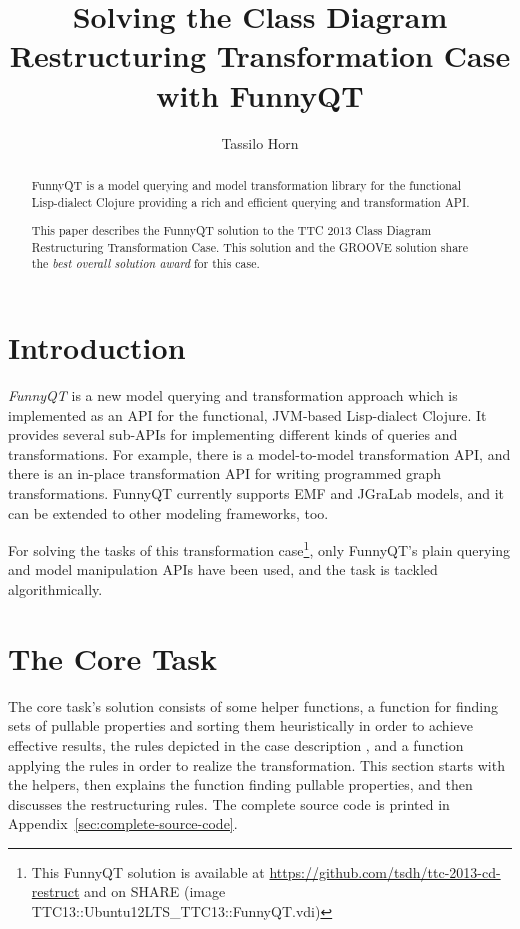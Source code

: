 \documentclass[submission]{eptcs}
\title{Solving the Class Diagram Restructuring Transformation Case with FunnyQT}
\author{Tassilo Horn
  \email{horn@uni-koblenz.de}
  \institute{Institute for Software Technology, University Koblenz-Landau, Germany}}
\begin{document}
\maketitle
\begin{abstract}
  FunnyQT is a model querying and model transformation library for the
  functional Lisp-dialect Clojure providing a rich and efficient querying and
  transformation API.

  This paper describes the FunnyQT solution to the TTC 2013 Class Diagram
  Restructuring Transformation Case.  This solution and the GROOVE solution
  share the \emph{best overall solution award} for this case.
\end{abstract}

\section{Introduction}
\label{sec:introduction}

\emph{FunnyQT} is a new model querying and transformation approach which is
implemented as an API for the functional, JVM-based Lisp-dialect Clojure.  It
provides several sub-APIs for implementing different kinds of queries and
transformations.  For example, there is a model-to-model transformation API,
and there is an in-place transformation API for writing programmed graph
transformations.  FunnyQT currently supports EMF and JGraLab models, and it can
be extended to other modeling frameworks, too.

For solving the tasks of this transformation case\footnote{This FunnyQT
  solution is available at \url{https://github.com/tsdh/ttc-2013-cd-restruct}
  and on SHARE (image
  \textsf{TTC13::Ubuntu12LTS\_TTC13::FunnyQT.vdi})\label{fn:github}}, only
FunnyQT's plain querying and model manipulation APIs have been used, and the
task is tackled algorithmically.


\section{The Core Task}
\label{sec:core-task}

The core task's solution consists of some helper functions, a function for
finding sets of pullable properties and sorting them heuristically in order to
achieve effective results, the rules depicted in the case description
\cite{cdrestructcasedesc}, and a function applying the rules in order to
realize the transformation.  This section starts with the helpers, then
explains the function finding pullable properties, and then discusses the
restructuring rules.  The complete source code is printed in
Appendix~\ref{sec:complete-source-code}.
\end{document}
